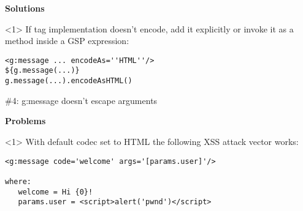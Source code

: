 {\begin{frame}
  \vspace{1cm}

    \Large
    \textbf{Solutions} \\[1em]

    \begin{onlyenv}<1>
      If tag implementation doesn't encode, add it explicitly or invoke it as a method inside a GSP expression:
      \begin{center}
        \begin{minipage}{.9\textwidth}
          \begin{verbatim}
<g:message ... encodeAs=''HTML''/>
${g.message(...)}
g.message(...).encodeAsHTML()
          \end{verbatim}
        \end{minipage}
      \end{center}
    \end{onlyenv}

    \vfill

\end{frame}



\begin{frame}

  \vspace{.5cm}

  \begin{center}
    \Huge\color{red} \#4: g:message doesn't escape arguments
  \end{center}

  \vspace{1cm}

    \Large
    \textbf{Problems} \\[1em]

    \begin{onlyenv}<1>
      With default codec set to HTML the following XSS attack vector works:
      \begin{center}
        \begin{minipage}{.9\textwidth}
          \begin{verbatim}
<g:message code='welcome' args='[params.user]'/>

where:
   welcome = Hi {0}!
   params.user = <script>alert('pwnd')</script>
          \end{verbatim}
        \end{minipage}
      \end{center}
    \end{onlyenv}


\end{frame}}
